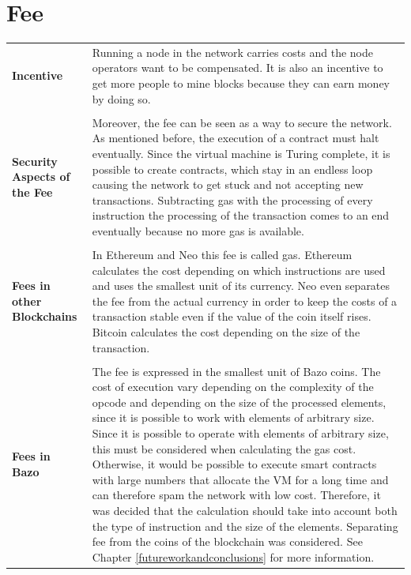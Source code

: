 \section{Fee} \label{fee}
\begin{tabular}[t]{ p{3cm} p{12.5cm}}
\raggedright
\textbf{Incentive} &
Running a node in the network carries costs and the node operators want to be compensated. It is also an incentive to get more people to mine blocks because they can earn money by doing so. \\ \\

\raggedright
\textbf{Security Aspects of the Fee} &
Moreover, the fee can be seen as a way to secure the network. As mentioned before, the execution of a contract must halt eventually. Since the virtual machine is Turing complete, it is possible to create contracts, which stay in an endless loop causing the network to get stuck and not accepting new transactions. Subtracting gas with the processing of every instruction the processing of the transaction comes to an end eventually because no more gas is available. \\ \\

\raggedright
\textbf{Fees in other Blockchains} &
In Ethereum and Neo this fee is called gas. Ethereum calculates the cost depending on which instructions are used and uses the smallest unit of its currency. Neo even separates the fee from the actual currency in order to keep the costs of a transaction stable even if the value of the coin itself rises. Bitcoin calculates the cost depending on the size of the transaction. \\ \\

\raggedright
\textbf{Fees in Bazo} &
The fee is expressed in the smallest unit of Bazo coins. The cost of execution vary depending on the complexity of the opcode and depending on the size of the processed elements, since it is possible to work with elements of arbitrary size. Since it is possible to operate with elements of arbitrary size, this must be considered when calculating the gas cost. Otherwise, it would be possible to execute smart contracts with large numbers that allocate the VM for a long time and can therefore spam the network with low cost. Therefore, it was decided that the calculation should take into account both the type of instruction and the size of the elements. Separating fee from the coins of the blockchain was considered. See Chapter \ref{futureworkandconclusions} for more information.
\end{tabular}

